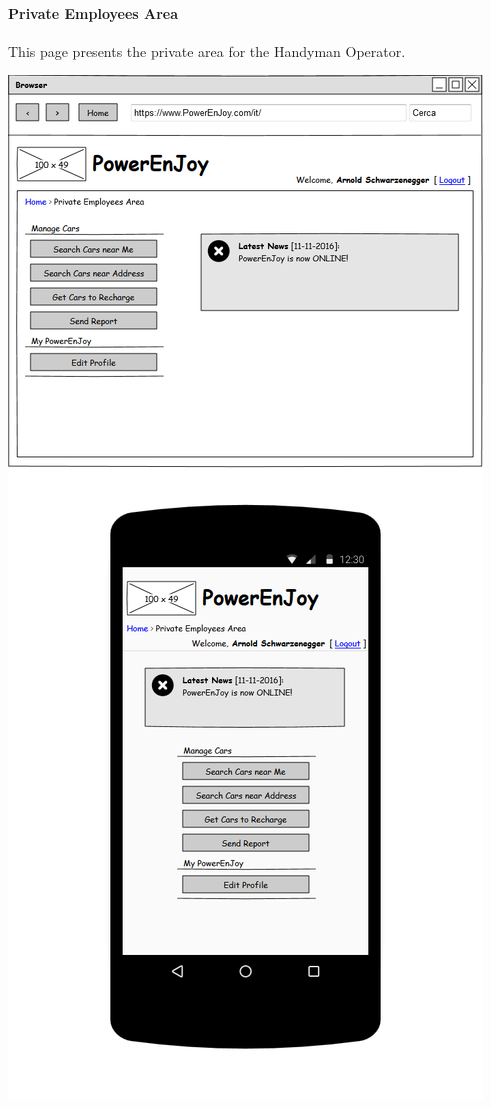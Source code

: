\paragraph{Private Employees Area} This page presents the private area for the Handyman Operator.
\begin{center}
	\includegraphics[width=0.6\linewidth]{"img/ui/private-area-employee"}
\end{center}
\pagebreak

